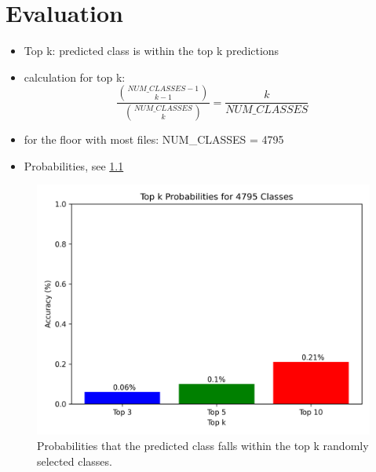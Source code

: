 \chapter{Evaluation}




\begin{itemize}
    \item Top k: predicted class is within the top k predictions
    \item calculation for top k: 
    \[\frac{\binom{NUM\_CLASSES - 1}{k - 1}}{\binom{NUM\_CLASSES}{k}} = \frac{k}{NUM\_CLASSES}\]
    \item for the floor with most files: NUM\_CLASSES = 4795
    \item Probabilities, see \cref{fig:random_accuracies_4795_classes}
\end{itemize}

\begin{figure}[h!]
    \centering
    \includegraphics*[scale=0.8]{images/random_accuracies_4795_classes.png}
    \caption{Probabilities that the predicted class falls within the top k randomly selected classes.}
    \label{fig:random_accuracies_4795_classes}
\end{figure}



